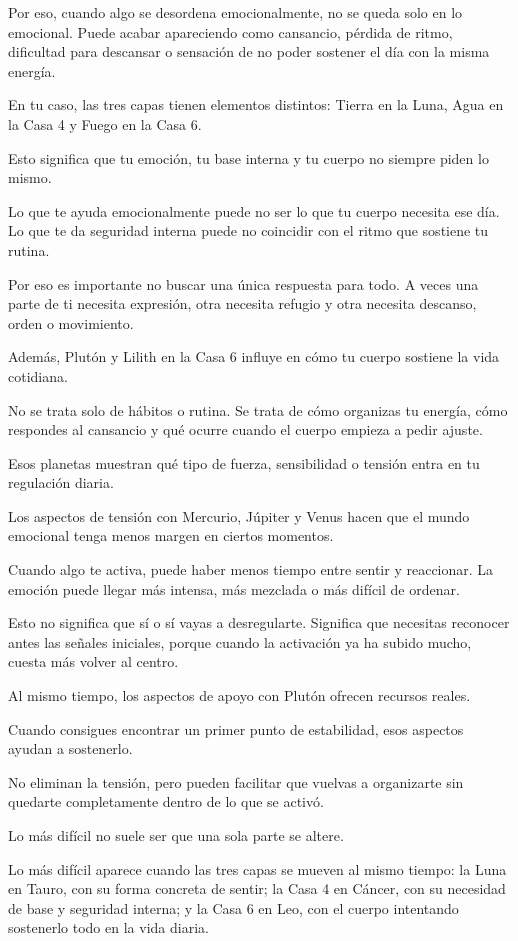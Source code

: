 \documentclass[11pt,a4paper]{article}
\begin{document}
Por eso, cuando algo se desordena emocionalmente, no se queda solo en lo emocional. Puede acabar apareciendo como cansancio, pérdida de ritmo, dificultad para descansar o sensación de no poder sostener el día con la misma energía.

En tu caso, las tres capas tienen elementos distintos: Tierra en la Luna, Agua en la Casa 4 y Fuego en la Casa 6.

Esto significa que tu emoción, tu base interna y tu cuerpo no siempre piden lo mismo.

Lo que te ayuda emocionalmente puede no ser lo que tu cuerpo necesita ese día. Lo que te da seguridad interna puede no coincidir con el ritmo que sostiene tu rutina.

Por eso es importante no buscar una única respuesta para todo. A veces una parte de ti necesita expresión, otra necesita refugio y otra necesita descanso, orden o movimiento.

Además, Plutón y Lilith en la Casa 6 influye en cómo tu cuerpo sostiene la vida cotidiana.

No se trata solo de hábitos o rutina. Se trata de cómo organizas tu energía, cómo respondes al cansancio y qué ocurre cuando el cuerpo empieza a pedir ajuste.

Esos planetas muestran qué tipo de fuerza, sensibilidad o tensión entra en tu regulación diaria.

Los aspectos de tensión con Mercurio, Júpiter y Venus hacen que el mundo emocional tenga menos margen en ciertos momentos.

Cuando algo te activa, puede haber menos tiempo entre sentir y reaccionar. La emoción puede llegar más intensa, más mezclada o más difícil de ordenar.

Esto no significa que sí o sí vayas a desregularte. Significa que necesitas reconocer antes las señales iniciales, porque cuando la activación ya ha subido mucho, cuesta más volver al centro.

Al mismo tiempo, los aspectos de apoyo con Plutón ofrecen recursos reales.

Cuando consigues encontrar un primer punto de estabilidad, esos aspectos ayudan a sostenerlo.

No eliminan la tensión, pero pueden facilitar que vuelvas a organizarte sin quedarte completamente dentro de lo que se activó.

Lo más difícil no suele ser que una sola parte se altere.

Lo más difícil aparece cuando las tres capas se mueven al mismo tiempo:
la Luna en Tauro, con su forma concreta de sentir;
la Casa 4 en Cáncer, con su necesidad de base y seguridad interna;
y la Casa 6 en Leo, con el cuerpo intentando sostenerlo todo en la vida diaria.
\end{document}
